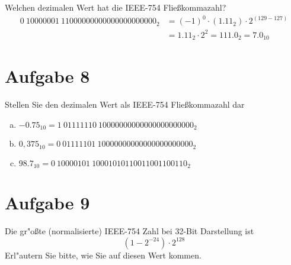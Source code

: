 \documentclass[10pt, oneside]{article}
\begin{document}
Welchen dezimalen Wert hat die IEEE-754 Flie{\ss}kommazahl?
\begin{align*}
    0\ 10000001\ 11000000000000000000000_2 &= (-1)^0 \cdot (1.11_2) \cdot 2^{(129 - 127)} \\
                                           &= 1.11_2 \cdot 2^{2} = 111.0_2 = 7.0_{10}
\end{align*}

\section{Aufgabe 8}

Stellen Sie den dezimalen Wert als IEEE-754 Fließkommazahl dar
\begin{enumerate}[(a)]
    \item $-0.75_{10} = 1\ 01111110\ 10000000000000000000000_2$
    \item $0,375_{10} = 0\ 01111101\ 10000000000000000000000_2$
    \item $98.7_{10} =  0\ 10000101\ 10001010110011001100110_2$
\end{enumerate}

\section{Aufgabe 9}

Die gr"o{\ss}te (normalisierte) IEEE-754 Zahl bei 32-Bit Darstellung ist
\begin{equation*}
    (1 - 2^{-24}) \cdot 2^{128}
\end{equation*}
Erl"autern Sie bitte, wie Sie auf diesen Wert kommen.
\end{document}
